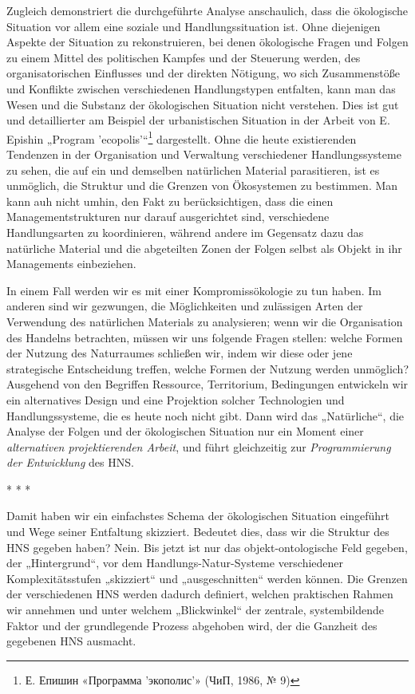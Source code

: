 \documentclass[11pt,a4paper]{article}
\begin{document}
Zugleich demonstriert die durchgeführte Analyse anschaulich, dass die
ökologische Situation vor allem eine soziale und Handlungssituation ist. Ohne
diejenigen Aspekte der Situation zu rekonstruieren, bei denen ökologische
Fragen und Folgen zu einem Mittel des politischen Kampfes und der Steuerung
werden, des organisatorischen Einflusses und der direkten Nötigung, wo sich
Zusammenstöße und Konflikte zwischen verschiedenen Handlungstypen entfalten,
kann man das Wesen und die Substanz der ökologischen Situation nicht
verstehen.  Dies ist gut und detaillierter am Beispiel der urbanistischen
Situation in der Arbeit von E. Epishin „Program 'ecopolis'“\footnote{
  \foreignlanguage{russian}{Е. Епишин «Программа 'экополис'» (ЧиП, 1986, №
    9)}} dargestellt. Ohne die heute existierenden Tendenzen in der
Organisation und Verwaltung verschiedener Handlungssysteme zu sehen, die auf
ein und demselben natürlichen Material parasitieren, ist es unmöglich, die
Struktur und die Grenzen von Ökosystemen zu bestimmen. Man kann auh nicht
umhin, den Fakt zu berücksichtigen, dass die einen Managementstrukturen nur
darauf ausgerichtet sind, verschiedene Handlungsarten zu koordinieren, während
andere im Gegensatz dazu das natürliche Material und die abgeteilten Zonen der
Folgen selbst als Objekt in ihr Managements einbeziehen.  

In einem Fall werden wir es mit einer Kompromissökologie zu tun haben. Im
anderen sind wir gezwungen, die Möglichkeiten und zulässigen Arten der
Verwendung des natürlichen Materials zu analysieren; wenn wir die Organisation
des Handelns betrachten, müssen wir uns folgende Fragen stellen: welche Formen
der Nutzung des Naturraumes schließen wir, indem wir diese oder jene
strategische Entscheidung treffen, welche Formen der Nutzung werden unmöglich?
Ausgehend von den Begriffen Ressource, Territorium, Bedingungen entwickeln wir
ein alternatives Design und eine Projektion solcher Technologien und
Handlungssysteme, die es heute noch nicht gibt.  Dann wird das „Natürliche“,
die Analyse der Folgen und der ökologischen Situation nur ein Moment einer
\emph{alternativen projektierenden Arbeit}, und führt gleichzeitig zur
\emph{Programmierung der Entwicklung} des HNS.

\begin{center}
  * * *
\end{center}

Damit haben wir ein einfachstes Schema der ökologischen Situation eingeführt
und Wege seiner Entfaltung skizziert. Bedeutet dies, dass wir die Struktur des
HNS gegeben haben? Nein. Bis jetzt ist nur das objekt-ontologische Feld
gegeben, der „Hintergrund“, vor dem Handlungs-Natur-Systeme verschiedener
Komplexitätsstufen „skizziert“ und „ausgeschnitten“ werden können.  Die
Grenzen der verschiedenen HNS werden dadurch definiert, welchen praktischen
Rahmen wir annehmen und unter welchem „Blickwinkel“ der zentrale,
systembildende Faktor und der grundlegende Prozess abgehoben wird, der die
Ganzheit des gegebenen HNS ausmacht.
\end{document}
